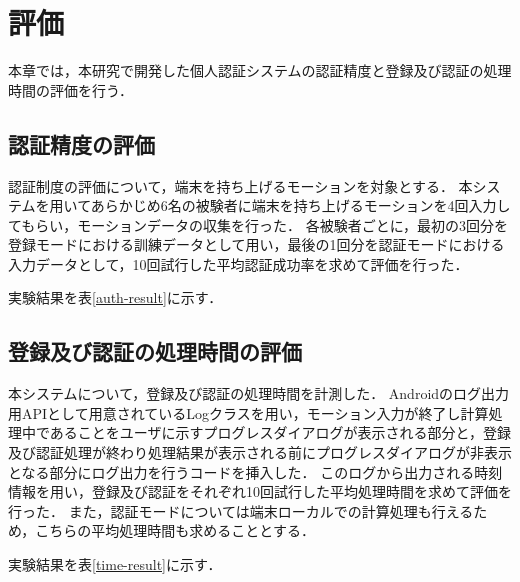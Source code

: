 \chapter{評価}
本章では，本研究で開発した個人認証システムの認証精度と登録及び認証の処理時間の評価を行う．

\section{認証精度の評価}
認証制度の評価について，端末を持ち上げるモーションを対象とする．
本システムを用いてあらかじめ6名の被験者に端末を持ち上げるモーションを4回入力してもらい，モーションデータの収集を行った．
各被験者ごとに，最初の3回分を登録モードにおける訓練データとして用い，最後の1回分を認証モードにおける入力データとして，10回試行した平均認証成功率を求めて評価を行った．

実験結果を表\ref{auth-result}に示す．


\section{登録及び認証の処理時間の評価}
本システムについて，登録及び認証の処理時間を計測した．
Androidのログ出力用APIとして用意されているLogクラス\cite{5-log}を用い，モーション入力が終了し計算処理中であることをユーザに示すプログレスダイアログが表示される部分と，登録及び認証処理が終わり処理結果が表示される前にプログレスダイアログが非表示となる部分にログ出力を行うコードを挿入した．
このログから出力される時刻情報を用い，登録及び認証をそれぞれ10回試行した平均処理時間を求めて評価を行った．
また，認証モードについては端末ローカルでの計算処理も行えるため，こちらの平均処理時間も求めることとする．

実験結果を表\ref{time-result}に示す．
